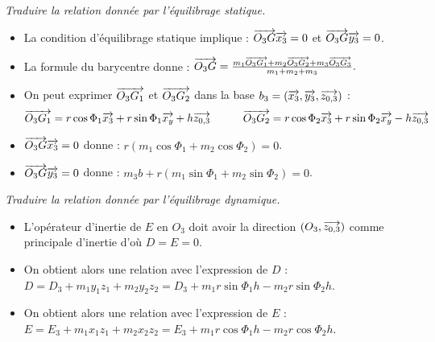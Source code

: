 \begin{exemple}
 \textit{Traduire la relation donnée par l'équilibrage statique.}
\begin{itemize}
\item La condition d'équilibrage statique implique : $\overrightarrow{O_3G} \overrightarrow{x_3}=0$ et $\overrightarrow{O_3G} \overrightarrow{y_3}=0$.
\item La formule du barycentre donne : 
$
\overrightarrow{O_3G}=\frac{m_1 \overrightarrow{O_3G_1}+m_2 \overrightarrow{O_3G_2}+m_3 \overrightarrow{O_3G_3}}{m_1+m_2+m_3}.
$
\item On peut exprimer $\overrightarrow{O_3G_1}$ et $\overrightarrow{O_3G_2}$ dans la base $b_3=\left(\overrightarrow{{x_3}},\overrightarrow{{y}_3},\overrightarrow{{z}_{0,3}} \right)$ :
$$
\overrightarrow{O_3G_1}=r \cos\Phi_1 \overrightarrow{x_3}+r \sin\Phi_1 \overrightarrow{x_y}+h \overrightarrow{z_{0,3}}
\quad\quad\quad
\overrightarrow{O_3G_2}=r \cos\Phi_2 \overrightarrow{x_3}+r \sin\Phi_2 \overrightarrow{x_y}-h \overrightarrow{z_{0,3}}
$$

\item $\overrightarrow{O_3G} \overrightarrow{x_3}=0$ donne : 
$
r \left(m_1 \cos\Phi_1+m_2 \cos\Phi_2 \right)=0$.
\item $\overrightarrow{O_3G} \overrightarrow{y_3}=0$ donne : 
$
m_3 b+r \left(m_1 \sin\Phi_1+m_2 \sin\Phi_2 \right)=0
$.
\end{itemize}


\textit{Traduire la relation donnée par l'équilibrage dynamique.}

\begin{itemize}
\item L'opérateur d'inertie de $E$ en $O_3$ doit avoir la direction $\left(O_3,\overrightarrow{{z_{0,3}}}\right)$  comme principale d'inertie d'où $D=E=0$.
\item On obtient alors une relation avec l'expression de $D$ : 
$
D=D_3+m_1 y_1 z_1+ m_2 y_2 z_2=D_3+m_1 r \sin\Phi_1 h-m_2 r \sin\Phi_2 h
$.
\item On obtient alors une relation avec l'expression de $E$ :
$E=E_3+m_1 x_1 z_1+m_2 x_2 z_2=E_3+m_1 r \cos\Phi_1 h-m_2 r \cos\Phi_2 h
$.
\end{itemize}

\end{exemple}

